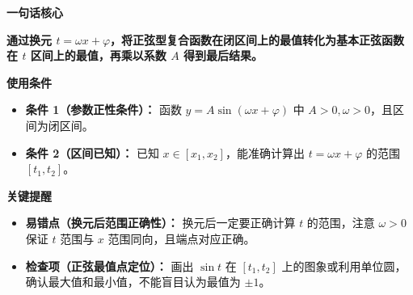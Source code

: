 \begin{summarybox}
	\textbf{\textcolor{CSummary}{一句话核心}}

	\textbf{通过换元 $t=\omega x+\varphi$，将正弦型复合函数在闭区间上的最值转化为基本正弦函数在 $t$ 区间上的最值，再乘以系数 $A$ 得到最后结果。}

	\medskip
	\textbf{\textcolor{CSummary}{使用条件}}
	\begin{itemize}[leftmargin=*, itemsep=0.5em, topsep=0.4em]
		\item \textbf{条件 1（参数正性条件）：} 函数 $y=A\sin(\omega x+\varphi)$ 中 $A>0,\omega>0$，且区间为闭区间。
		\item \textbf{条件 2（区间已知）：} 已知 $x\in[x_1,x_2]$，能准确计算出 $t=\omega x+\varphi$ 的范围 $[t_1,t_2]$。
	\end{itemize}

	\medskip
	\textbf{\textcolor{CSummary}{关键提醒}}
	\begin{itemize}[leftmargin=*, itemsep=0.5em, topsep=0.4em]
		\item \textbf{易错点（换元后范围正确性）：} 换元后一定要正确计算 $t$ 的范围，注意 $\omega>0$ 保证 $t$ 范围与 $x$ 范围同向，且端点对应正确。
		\item \textbf{检查项（正弦最值点定位）：} 画出 $\sin t$ 在 $[t_1,t_2]$ 上的图象或利用单位圆，确认最大值和最小值，不能盲目认为最值为 $\pm1$。
	\end{itemize}
\end{summarybox}
